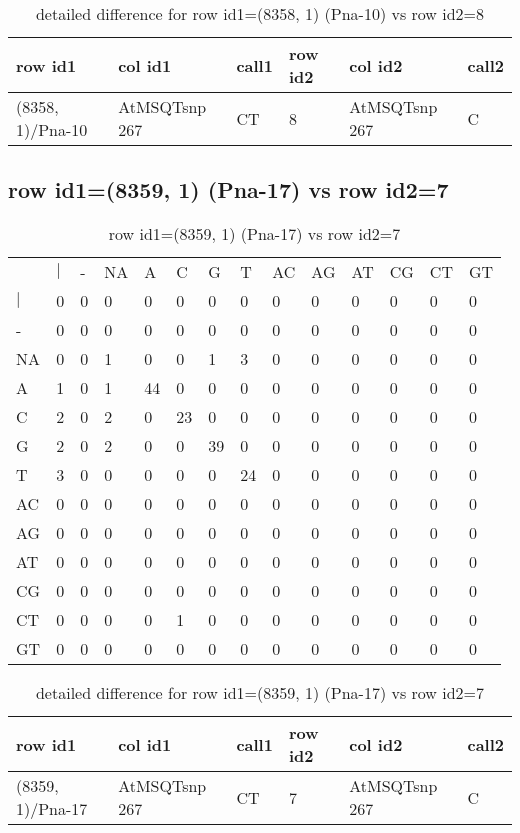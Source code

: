 \begin{center}
\begin{longtable}{|l|l|l|l|l|l|}
\caption{detailed difference for row id1=(8358, 1) (Pna-10) vs row id2=8} \label{table_dm381}\\
\hline
row id1&col id1&call1&row id2&col id2&call2\\
\hline
(8358, 1)/Pna-10&AtMSQTsnp 267&CT&8&AtMSQTsnp 267&C\\
\hline
\end{longtable}
\end{center}

\subsection{row id1=(8359, 1) (Pna-17) vs row id2=7}
\begin{center}
\begin{longtable}{|l|l|l|l|l|l|l|l|l|l|l|l|l|l|}
\caption{row id1=(8359, 1) (Pna-17) vs row id2=7} \label{table_dm382}\\
\hline
\\
\hline
&$|$&-&NA&A&C&G&T&AC&AG&AT&CG&CT&GT\\
$|$&0&0&0&0&0&0&0&0&0&0&0&0&0\\
-&0&0&0&0&0&0&0&0&0&0&0&0&0\\
NA&0&0&1&0&0&1&3&0&0&0&0&0&0\\
A&1&0&1&44&0&0&0&0&0&0&0&0&0\\
C&2&0&2&0&23&0&0&0&0&0&0&0&0\\
G&2&0&2&0&0&39&0&0&0&0&0&0&0\\
T&3&0&0&0&0&0&24&0&0&0&0&0&0\\
AC&0&0&0&0&0&0&0&0&0&0&0&0&0\\
AG&0&0&0&0&0&0&0&0&0&0&0&0&0\\
AT&0&0&0&0&0&0&0&0&0&0&0&0&0\\
CG&0&0&0&0&0&0&0&0&0&0&0&0&0\\
CT&0&0&0&0&1&0&0&0&0&0&0&0&0\\
GT&0&0&0&0&0&0&0&0&0&0&0&0&0\\
\hline
\end{longtable}
\end{center}

\begin{center}
\begin{longtable}{|l|l|l|l|l|l|}
\caption{detailed difference for row id1=(8359, 1) (Pna-17) vs row id2=7} \label{table_dm383}\\
\hline
row id1&col id1&call1&row id2&col id2&call2\\
\hline
(8359, 1)/Pna-17&AtMSQTsnp 267&CT&7&AtMSQTsnp 267&C\\
\hline
\end{longtable}
\end{center}

